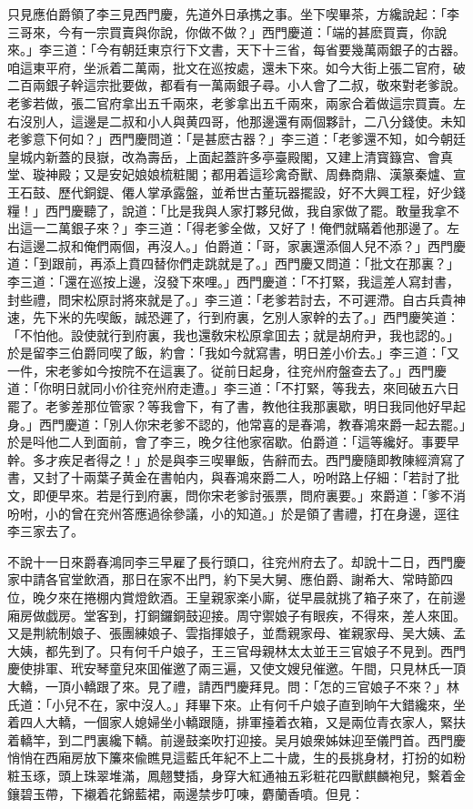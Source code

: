 只見應伯爵領了李三見西門慶，先道外日承携之事。坐下喫畢茶，方纔說起：「李三哥來，今有一宗買賣與你說，你做不做？」西門慶道：「端的甚麽買賣，你說來。」李三道：「今有朝廷東京行下文書，天下十三省，每省要幾萬兩銀子的古器。咱這東平府，坐派着二萬兩，批文在巡按處，還未下來。如今大街上張二官府，破二百兩銀子幹這宗批要做，都看有一萬兩銀子尋。小人會了二叔，敬來對老爹說。老爹若做，張二官府拿出五千兩來，老爹拿出五千兩來，兩家合着做這宗買賣。左右沒別人，這邊是二叔和小人與黄四哥，他那邊還有兩個夥計，二八分錢使。未知老爹意下何如？」西門慶問道：「是甚麽古器？」李三道：「老爹還不知，如今朝廷皇城内新蓋的艮嶽，改為壽岳，上面起蓋許多亭臺殿閣，又建上清寳籙宫、會真堂、璇神殿；又是安妃娘娘梳粧閣；都用着這珍禽奇獸、周彝商鼎、漢篆秦爐、宣王石鼓、歷代銅鍉、僊人掌承露盤，並希世古董玩器擺設，好不大興工程，好少錢糧！」西門慶聽了，說道：「比是我與人家打夥兒做，我自家做了罷。敢量我拿不出這一二萬銀子來？」李三道：「得老爹全做，又好了！俺們就瞞着他那邊了。左右這邊二叔和俺們兩個，再沒人。」伯爵道：「哥，家裏還添個人兒不添？」西門慶道：「到跟前，再添上賁四替你們走跳就是了。」西門慶又問道：「批文在那裏？」李三道：「還在巡按上邊，沒發下來哩。」西門慶道：「不打緊，我這差人寫封書，封些禮，問宋松原討將來就是了。」李三道：「老爹若討去，不可遲滯。自古兵貴神速，先下米的先喫飯，誠恐遲了，行到府裏，乞別人家幹的去了。」西門慶笑道：「不怕他。設使就行到府裏，我也還敎宋松原拿囬去；就是胡府尹，我也認的。」於是留李三伯爵同喫了飯，約會：「我如今就寫書，明日差小价去。」李三道：「又一件，宋老爹如今按院不在這裏了。従前日起身，往兖州府盤查去了。」西門慶道：「你明日就同小价往兖州府走遭。」李三道：「不打緊，等我去，來囘破五六日罷了。老爹差那位管家？等我會下，有了書，教他往我那裏歇，明日我同他好早起身。」西門慶道：「別人你宋老爹不認的，他常喜的是春鴻，教春鴻來爵一起去罷。」於是呌他二人到面前，會了李三，晚夕往他家宿歇。伯爵道：「這等纔好。事要早幹。多才疾足者得之！」於是與李三喫畢飯，告辭而去。西門慶隨即教陳經濟寫了書，又封了十兩葉子黄金在書帕内，與春鴻來爵二人，吩咐路上仔細：「若討了批文，即便早來。若是行到府裏，問你宋老爹討張票，問府裏要。」來爵道：「爹不消吩咐，小的曾在兖州答應過徐參議，小的知道。」於是領了書禮，打在身邊，逕往李三家去了。

不說十一日來爵春鴻同李三早雇了長行頭口，往兖州府去了。却說十二日，西門慶家中請各官堂飲酒，那日在家不出門，約下吴大舅、應伯爵、謝希大、常時節四位，晚夕來在捲棚内賞燈飲酒。王皇親家楽小廝，従早晨就挑了箱子來了，在前邊廂房做戯房。堂客到，打銅鑼銅鼓迎接。周守禦娘子有眼疾，不得來，差人來囬。又是荆統制娘子、張團練娘子、雲指揮娘子，並喬親家母、崔親家母、吴大姨、孟大姨，都先到了。只有何千户娘子，王三官母親林太太並王三官娘子不見到。西門慶使排軍、玳安琴童兒來囬催邀了兩三遍，又使文嫂兒催邀。午間，只見林氏一頂大轎，一頂小轎跟了來。見了禮，請西門慶拜見。問：「怎的三官娘子不來？」林氏道：「小兒不在，家中沒人。」拜畢下來。止有何千户娘子直到晌午大錯纔來，坐着四人大轎，一個家人媳婦坐小轎跟隨，排軍擡着衣箱，又是兩位青衣家人，緊扶着轎竿，到二門裏纔下轎。前邊鼓楽吹打迎接。吴月娘衆姊妹迎至儀門首。西門慶悄悄在西廂房放下簾來偸瞧見這藍氏年紀不上二十歲，生的長挑身材，打扮的如粉粧玉琢，頭上珠翠堆滿，鳳翹雙插，身穿大紅通袖五彩粧花四獸麒麟袍兒，繫着金鑲碧玉帶，下襯着花錦藍裙，兩邊禁步叮㖦，麝蘭香噴。但見：

